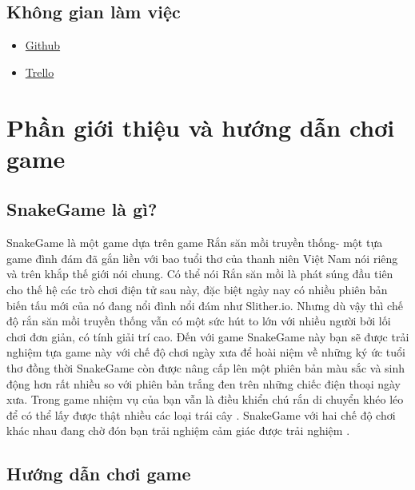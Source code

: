 \documentclass[13pt,a4paper]{article}
\begin{document}
\subsection{Không gian làm việc}
\begin{itemize}
   \item \href { https://github.com/ngoctienUIT/SnakeGame } { Github }
    \item \href { https://trello.com/b/aph53kLG } { Trello }
\end{itemize}
\newpage
\section{Phần giới thiệu và hướng dẫn chơi game }
\subsection{SnakeGame là gì?}
\setlength{\parindent}{0.5 cm}
SnakeGame là một game dựa trên game Rắn săn mồi truyền thống- một tựa game đình đám đã gắn liền với bao tuổi thơ của thanh niên Việt Nam nói riêng và trên khắp thế giới nói chung. Có thể nói Rắn săn mồi là phát súng đầu tiên cho thế hệ các trò chơi điện tử sau này, đặc biệt ngày nay có nhiều phiên bản biến tấu mới của nó đang nổi đình nổi đám như Slither.io. Nhưng dù vậy thì chế độ rắn săn mồi truyền thống vẫn có một sức hút to lớn với nhiều người bởi lối chơi đơn giản, có tính giải trí cao. Đến với game SnakeGame này bạn sẽ được trải nghiệm tựa game này với chế độ chơi ngày xưa để hoài niệm về những ký ức tuổi thơ đồng thời SnakeGame còn được nâng cấp lên  một phiên bản màu sắc và sinh động hơn rất nhiều so với phiên bản trắng đen trên những chiếc điện thoại ngày xưa. Trong game nhiệm vụ của bạn vẫn là điều khiển chú rắn di chuyển khéo léo để có thể lấy được thật nhiều các loại trái cây . SnakeGame  với hai chế độ chơi khác nhau đang chờ đón bạn trải nghiệm cảm giác được trải nghiệm .
\subsection{Hướng dẫn chơi game}
\end{document}
